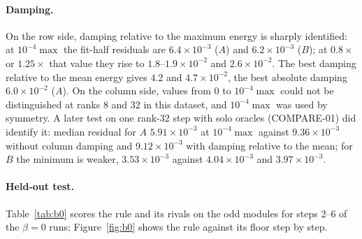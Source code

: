 \documentclass[11pt]{article}
\begin{document}
\paragraph{Damping.} On the row side, damping relative to the maximum energy is sharply identified:
at $10^{-4}\max$ the fit-half residuals are $6.4\times10^{-3}$ ($A$) and $6.2\times10^{-3}$ ($B$);
at $0.8\times$ or $1.25\times$ that value they rise to $1.8$--$1.9\times10^{-2}$ and
$2.6\times10^{-2}$. The best damping relative to the mean energy gives $4.2$ and
$4.7\times10^{-2}$, the best absolute damping $6.0\times10^{-2}$ ($A$). On the column side, values
from 0 to $10^{-4}\max$ could not be distinguished at ranks 8 and 32 in this dataset, and
$10^{-4}\max$ was used by symmetry. A later test on one rank-32 step with solo oracles
(COMPARE-01) did identify it: median residual for $A$ $5.91\times10^{-3}$ at $10^{-4}\max$ against
$9.36\times10^{-3}$ without column damping and $9.12\times10^{-3}$ with damping relative to the
mean; for $B$ the minimum is weaker, $3.53\times10^{-3}$ against $4.04\times10^{-3}$ and
$3.97\times10^{-3}$.

\paragraph{Held-out test.} Table~\ref{tab:b0} scores the rule and its rivals on the odd modules for
steps 2--6 of the $\beta=0$ runs; Figure~\ref{fig:b0} shows the rule against its floor step by step.
\end{document}
